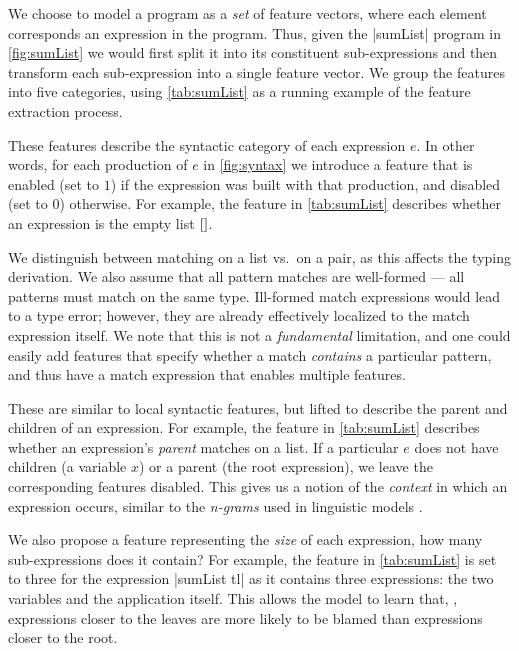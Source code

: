 We choose to model a program as a \emph{set} of feature vectors, where each
element corresponds an expression in the program. Thus, given the |sumList|
program in \autoref{fig:sumList} we would first split it into its constituent
sub-expressions and then transform each sub-expression into a single feature
vector. We group the features into five categories, using \autoref{tab:sumList}
as a running example of the feature extraction process.

These features describe the syntactic category of each expression $e$. In other
words, for each production of $e$ in \autoref{fig:syntax} we introduce a feature
that is enabled (set to $1$) if the expression was built with that production,
and disabled (set to $0$) otherwise. For example, the \IsNil feature in
\autoref{tab:sumList} describes whether an expression is the empty list $\mathtt{[]}$.

We distinguish between matching on a list vs.\ on a pair, as this affects the
typing derivation. We also assume that all pattern matches are well-formed ---
\ie all patterns must match on the same type. Ill-formed match expressions would
lead to a type error; however, they are already effectively localized to the
match expression itself. We note that this is not a \emph{fundamental}
limitation, and one could easily add features that specify whether a match
\emph{contains} a particular pattern, and thus have a match expression that
enables multiple features.

These are similar to local syntactic features, but lifted to describe the parent
and children of an expression. For example, the \IsCaseListP feature in
\autoref{tab:sumList} describes whether an expression's \emph{parent} matches on
a list. If a particular $e$ does not have children (\eg a variable $x$) or a
parent (\ie the root expression), we leave the corresponding features disabled.
This gives us a notion of the \emph{context} in which an expression occurs,
similar to the \emph{n-grams} used in linguistic models
\citep{Hindle2012-hf,Gabel2010-el}.

We also propose a feature representing the \emph{size} of each expression, \ie
how many sub-expressions does it contain? For example, the \ExprSize feature in
\autoref{tab:sumList} is set to three for the expression |sumList tl| as it
contains three expressions: the two variables and the application itself. This
allows the model to learn that, \eg, expressions closer to the leaves are more
likely to be blamed than expressions closer to the root.

